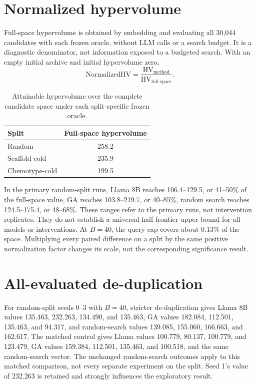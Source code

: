 \section{Normalized hypervolume}
\label{app:normalized-hv}
Full-space hypervolume is obtained by embedding and evaluating all 30,044 candidates with each frozen oracle, without LLM calls or a search budget. It is a diagnostic denominator, not information exposed to a budgeted search. With an empty initial archive and initial hypervolume zero,
\begin{equation}
\mathrm{NormalizedHV}=\frac{\mathrm{HV}_{\mathrm{method}}}{\mathrm{HV}_{\mathrm{full\text{-}space}}}.
\end{equation}
\begin{table}[htbp]
\caption{Attainable hypervolume over the complete candidate space under each split-specific frozen oracle.}
\label{tab:full-space-hv}
\centering
\begin{tabular}{@{}lc@{}}
\toprule
Split & Full-space hypervolume \\
\midrule
Random & 258.2 \\
Scaffold-cold & 235.9 \\
Chemotype-cold & 199.5 \\
\bottomrule
\end{tabular}
\end{table}

In the primary random-split runs, Llama 8B reaches 106.4--129.5, or 41--50\% of the full-space value, GA reaches 103.8--219.7, or 40--85\%, random search reaches 124.5--175.4, or 48--68\%. These ranges refer to the primary runs, not intervention replicates. They do not establish a universal half-frontier upper bound for all models or interventions. At $B=40$, the query cap covers about 0.13\% of the space. Multiplying every paired difference on a split by the same positive normalization factor changes its scale, not the corresponding significance result.

\section{All-evaluated de-duplication}
\label{app:dedup-all-evaluated}
For random-split seeds 0--3 with $B=40$, stricter de-duplication gives Llama 8B values 135.463, 232.263, 134.490, and 135.463, GA values 182.084, 112.501, 135.463, and 94.317, and random-search values 139.085, 155.060, 166.663, and 162.617. The matched control gives Llama values 100.779, 80.137, 100.779, and 123.479, GA values 159.384, 112.501, 135.463, and 100.518, and the same random-search vector. The unchanged random-search outcomes apply to this matched comparison, not every separate experiment on the split. Seed 1's value of 232.263 is retained and strongly influences the exploratory result.

